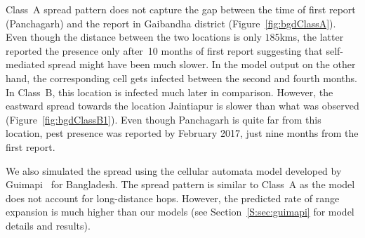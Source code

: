 \documentclass[11pt]{article}
\theoremstyle{definition}
\begin{document}
Class~A spread pattern does not capture the gap between the time of first
report (Panchagarh) and the report in Gaibandha district
(Figure~\ref{fig:bgdClassA}). Even though the distance between the two
locations is only $185$kms, the latter reported the presence only after~10
months of first report suggesting that self-mediated spread might have been
much slower. In the model output on the other hand, the corresponding cell
gets infected between the second and fourth months.  In Class~B, this
location is infected much later in comparison. However, the eastward spread
towards the location Jaintiapur is slower than what was observed
(Figure~\ref{fig:bgdClassB1}). Even though Panchagarh is quite far from
this location, pest presence was reported by February 2017, just nine
months from the first report.  

We also simulated the spread using the cellular automata model developed by
Guimapi~\cite{guimapi2016modeling} for Bangladesh. The spread pattern is
similar to Class~A as the model does not account for long-distance
hops. However, the predicted rate of range expansion is much higher than
our models (see Section~\ref{S:sec:guimapi} for model details and results).
\end{document}

